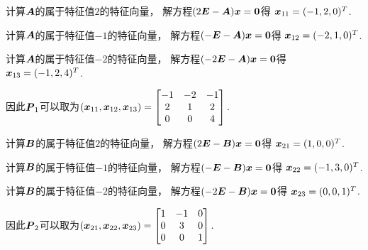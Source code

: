 \begin{example}
\begin{solution}
计算\(\boldsymbol{A}\)的属于特征值\(2\)的特征向量，
解方程\((2\boldsymbol{E}-\boldsymbol{A}) \boldsymbol{x} = \boldsymbol0\)得
\(\boldsymbol{x}_{11} = (-1,2,0)^T\).

计算\(\boldsymbol{A}\)的属于特征值\(-1\)的特征向量，
解方程\((-\boldsymbol{E}-\boldsymbol{A}) \boldsymbol{x} = \boldsymbol0\)得
\(\boldsymbol{x}_{12} = (-2,1,0)^T\).

计算\(\boldsymbol{A}\)的属于特征值\(-2\)的特征向量，
解方程\((-2\boldsymbol{E}-\boldsymbol{A}) \boldsymbol{x} = \boldsymbol0\)得
\(\boldsymbol{x}_{13} = (-1,2,4)^T\).

因此\(\boldsymbol{P}_1\)可以取为\begin{math}
	(\boldsymbol{x}_{11},\boldsymbol{x}_{12},\boldsymbol{x}_{13})
	= \begin{bmatrix}
		-1 & -2 & -1 \\
		2 & 1 & 2 \\
		0 & 0 & 4
	\end{bmatrix}.
\end{math}

计算\(\boldsymbol{B}\)的属于特征值\(2\)的特征向量，
解方程\((2\boldsymbol{E}-\boldsymbol{B}) \boldsymbol{x} = \boldsymbol0\)得
\(\boldsymbol{x}_{21} = (1,0,0)^T\).

计算\(\boldsymbol{B}\)的属于特征值\(-1\)的特征向量，
解方程\((-\boldsymbol{E}-\boldsymbol{B}) \boldsymbol{x} = \boldsymbol0\)得
\(\boldsymbol{x}_{22} = (-1,3,0)^T\).

计算\(\boldsymbol{B}\)的属于特征值\(-2\)的特征向量，
解方程\((-2\boldsymbol{E}-\boldsymbol{B}) \boldsymbol{x} = \boldsymbol0\)得
\(\boldsymbol{x}_{23} = (0,0,1)^T\).

因此\(\boldsymbol{P}_2\)可以取为\begin{math}
	(\boldsymbol{x}_{21},\boldsymbol{x}_{22},\boldsymbol{x}_{23})
	= \begin{bmatrix}
		1 & -1 & 0 \\
		0 & 3 & 0 \\
		0 & 0 & 1
	\end{bmatrix}.
\end{math}


\end{solution}
\end{example}
